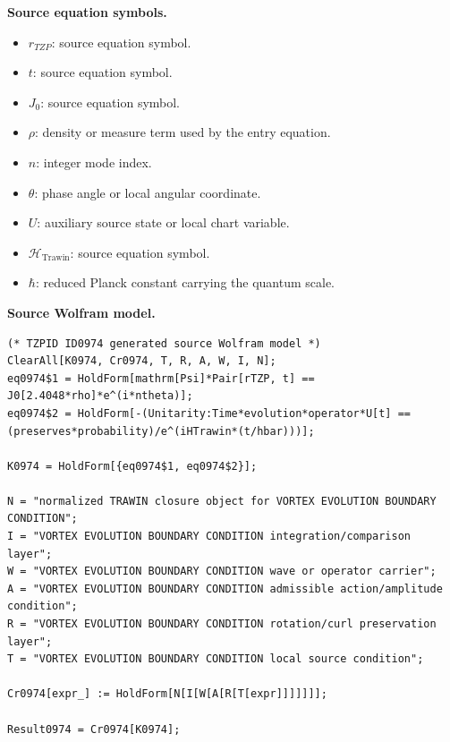 \begin{minipage}[t]{0.49\linewidth}
\begingroup
\small
\raggedright
\textbf{Source equation symbols.}\par
\begin{itemize}[leftmargin=1.35em,itemsep=1pt,topsep=1pt,parsep=0pt]
    \item $r_{TZP}$: source equation symbol.
    \item $t$: source equation symbol.
    \item $J_0$: source equation symbol.
    \item $\rho$: density or measure term used by the entry equation.
    \item $n$: integer mode index.
    \item $\theta$: phase angle or local angular coordinate.
    \item $U$: auxiliary source state or local chart variable.
    \item $\mathcal{H}_{\mathrm{Trawin}}$: source equation symbol.
    \item $\hbar$: reduced Planck constant carrying the quantum scale.
\end{itemize}
\endgroup
\end{minipage}\hfill
\begin{minipage}[t]{0.47\linewidth}
\begingroup
\scriptsize
\raggedright
\textbf{Source Wolfram model.}\par
\begin{Verbatim}[fontsize=\tiny,breaklines=true,breakanywhere=true]
(* TZPID ID0974 generated source Wolfram model *)
ClearAll[K0974, Cr0974, T, R, A, W, I, N];
eq0974$1 = HoldForm[mathrm[Psi]*Pair[rTZP, t] == J0[2.4048*rho]*e^(i*ntheta)];
eq0974$2 = HoldForm[-(Unitarity:Time*evolution*operator*U[t] == (preserves*probability)/e^(iHTrawin*(t/hbar)))];

K0974 = HoldForm[{eq0974$1, eq0974$2}];

N = "normalized TRAWIN closure object for VORTEX EVOLUTION BOUNDARY CONDITION";
I = "VORTEX EVOLUTION BOUNDARY CONDITION integration/comparison layer";
W = "VORTEX EVOLUTION BOUNDARY CONDITION wave or operator carrier";
A = "VORTEX EVOLUTION BOUNDARY CONDITION admissible action/amplitude condition";
R = "VORTEX EVOLUTION BOUNDARY CONDITION rotation/curl preservation layer";
T = "VORTEX EVOLUTION BOUNDARY CONDITION local source condition";

Cr0974[expr_] := HoldForm[N[I[W[A[R[T[expr]]]]]]];

Result0974 = Cr0974[K0974];
\end{Verbatim}
\endgroup
\end{minipage}


